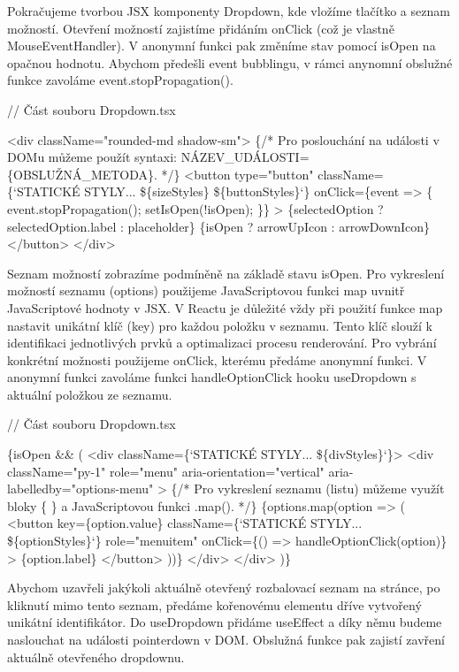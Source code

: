 Pokračujeme tvorbou JSX komponenty Dropdown, kde vložíme tlačítko a seznam možností. Otevření možností zajistíme přidáním onClick (což je vlastně MouseEventHandler). 
V anonymní funkci pak změníme stav pomocí isOpen na opačnou hodnotu. Abychom předešli event bubblingu, v rámci anynomní obslužné funkce zavoláme event.stopPropagation().

\begin{prog}
// Část souboru Dropdown.tsx

<div className="rounded-md shadow-sm">
  \{/* Pro poslouchání na události v DOMu můžeme použít syntaxi: 
    NÁZEV_UDÁLOSTI=\{OBSLUŽNÁ_METODA\}. */\}
  <button
    type="button"
    className=\{`STATICKÉ STYLY... \$\{sizeStyles\} \$\{buttonStyles\}`\}
    onClick=\{event => \{
      event.stopPropagation();
      setIsOpen(!isOpen);
    \}\}
  >
    \{selectedOption ? selectedOption.label : placeholder\}
    \{isOpen ? arrowUpIcon : arrowDownIcon\}
  </button>
</div>
\end{prog}

Seznam možností zobrazíme podmíněně na základě stavu isOpen. Pro vykreslení možností seznamu (options) použijeme JavaScriptovou funkci map uvnitř JavaScriptové hodnoty v JSX. 
V Reactu je důležité vždy při použití funkce map nastavit unikátní klíč (key) pro každou položku v seznamu. Tento klíč slouží k identifikaci jednotlivých prvků a optimalizaci procesu renderování. 
Pro vybrání konkrétní možnosti použijeme onClick, kterému předáme anonymní funkci. V anonymní funkci zavoláme funkci handleOptionClick hooku useDropdown s aktuální položkou ze seznamu.

\begin{prog}
// Část souboru Dropdown.tsx

\{isOpen && (
  <div className=\{`STATICKÉ STYLY... \$\{divStyles\}`\}>
    <div
      className="py-1"
      role="menu"
      aria-orientation="vertical"
      aria-labelledby="options-menu"
    >
      \{/* Pro vykreslení seznamu (listu) můžeme využít bloky \{ \}
       a JavaScriptovou funkci .map(). */\}
      \{options.map(option => (
        <button
          key=\{option.value\}
          className=\{`STATICKÉ STYLY... \$\{optionStyles\}`\}
          role="menuitem"
          onClick=\{() => handleOptionClick(option)\}
        >
          \{option.label\}
        </button>
      ))\}
    </div>
  </div>
)\}
\end{prog}

Abychom uzavřeli jakýkoli aktuálně otevřený rozbalovací seznam na stránce, po kliknutí mimo tento seznam, předáme kořenovému elementu dříve vytvořený unikátní identifikátor. 
Do useDropdown přidáme useEffect a díky němu budeme naslouchat na události pointerdown v DOM. Obslužná funkce pak zajistí zavření aktuálně otevřeného dropdownu.

